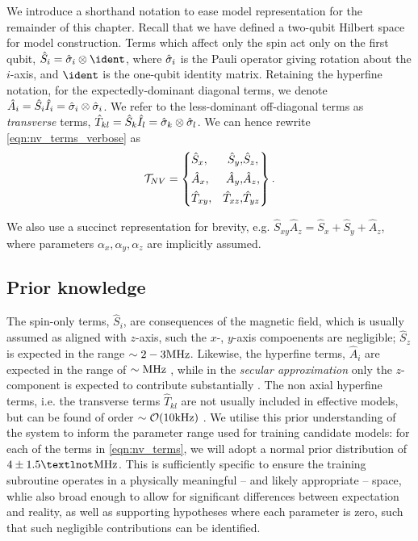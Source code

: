 We introduce a shorthand notation to ease model representation for the remainder of this chapter. 
Recall that we have defined a two-qubit Hilbert space for model construction.
Terms which affect only the spin act only on the first qubit, $\hat{S}_i = \s_i \otimes \ident$, 
    where $\hat{\sigma}_i$ is the Pauli operator giving rotation about the $i$-axis, and 
    $\ident$ is the one-qubit identity matrix. 
Retaining the hyperfine notation, for the expectedly-dominant diagonal terms, we denote $\hat{A}_i = \hat{S}_i \hat{I}_i = \hat{\sigma}_i \otimes \hat{\sigma}_i$. 
We refer to the less-dominant off-diagonal terms as \emph{transverse} terms, $\hat{T}_{kl} = \hat{S}_k \hat{I}_l = \hat{\sigma}_k \otimes \hat{\sigma}_l$. 
We can hence rewrite \cref{eqn:nv_terms_verbose} as 
\begin{equation}
    \label{eqn:nv_terms}
    { \mathcal{T} }_{NV} = \left\{ 
        \begin{split}    
            &\hat{S}_x, &\hat{S}_y,  &\hat{S}_z, \\
            &\hat{A}_x,  &\hat{A}_y,  &\hat{A}_z, \\
            &\hat{T}_{xy},  &\hat{T}_{xz}, &\hat{T}_{yz} 
        \end{split}
    \right\}.
\end{equation}

We also use a succinct representation for brevity, e.g. $\hat{S}_{xy}\hat{A}_z =  \hat{S}_x + \hat{S}_y + \hat{A}_z$, 
    where parameters $\alpha_x, \alpha_y, \alpha_z$ are implicitly assumed. 

\subsection{Prior knowledge}

The spin-only terms, $\hat{S}_i$, are consequences of the magnetic field, which is usually assumed as aligned with $z$-axis,
    such the $x$-, $y$-axis compoenents are negligible;
    $\hat{S}_z$ is expected in the range $\sim 2-3 \textrm{MHz}$.
Likewise, the hyperfine terms, $\hat{A}_i$ are expected in the range of $\sim \textrm{MHz}$ \cite{gali2008ab}, 
    while in the \emph{secular approximation} only the $z$-component is expected to contribute substantially \cite{dutt2007quantum}. 
The non axial hyperfine terms, i.e. the transverse terms $\hat{T}_{kl}$ are not usually included in effective models, 
    but can be found of order $\sim\mathcal{O}(10 \textrm{kHz})$ \cite{hou2019experimental}. 
We utilise this prior understanding of the system to inform the parameter range used for training candidate models: 
    for each of the terms in \cref{eqn:nv_terms}, we will adopt a normal prior distribution of $4 \pm 1.5¬ \mhz$. 
This is sufficiently specific to ensure the training subroutine operates in a physically meaningful -- 
    and likely appropriate -- space, whlie also broad enough to allow for significant differences between expectation and reality, 
    as well as supporting hypotheses where each parameter is zero, 
    such that such negligible contributions can be identified.

